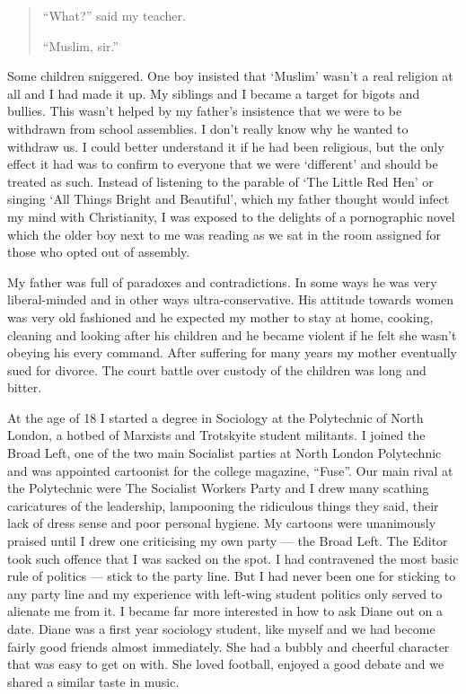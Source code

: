 \documentclass[12pt]{memoir}
\def\–{-\hskip0pt}
\begin{document}
\begin{quote}
“What?” said my teacher.

“Muslim, sir.”
\end{quote}

Some children sniggered.
One boy insisted that ‘Muslim’ wasn’t a real religion at all
and I had made it up.
My siblings and I became a target for bigots and bullies.
This wasn’t helped by my father’s insistence
that we were to be withdrawn from school assemblies.
I don’t really know why he wanted to withdraw us.
I could better understand it if he had been religious,
but the only effect it had was to confirm to everyone
that we were ‘different’ and should be treated as such.
Instead of listening to the parable of ‘The Little Red Hen’
or singing ‘All Things Bright and Beautiful’,
which my father thought would infect my mind with Christianity,
I was exposed to the delights of a pornographic novel
which the older boy next to me was reading
as we sat in the room assigned for those who opted out of assembly.

My father was full of paradoxes and contradictions.
In some ways he was very liberal-minded and in other ways ultra\–conservative.
His attitude towards women was very old fashioned
and he expected my mother to stay at home, cooking,
cleaning and looking after his children
and he became violent if he felt she wasn’t obeying his every command.
After suffering for many years my mother eventually sued for divorce.
The court battle over custody of the children was long and bitter.


At the age of 18 I started a degree in Sociology
at the Polytechnic of North London,
a hotbed of Marxists and Trotskyite student militants.
I joined the Broad Left, one of the two main Socialist parties
at North London Polytechnic and was appointed cartoonist
for the college magazine, “Fuse”.
Our main rival at the Polytechnic were The Socialist Workers Party
and I drew many scathing caricatures of the leadership,
lampooning the ridiculous things they said,
their lack of dress sense and poor personal hygiene.
My cartoons were unanimously praised until I drew one
criticising my own party — the Broad Left.
The Editor took such offence that I was sacked on the spot.
I had contravened the most basic rule of politics — stick to the party line.
But I had never been one for sticking to any party line
and my experience with left-wing student politics
only served to alienate me from it.
I became far more interested in how to ask Diane out on a date.
Diane was a first year sociology student,
like myself and we had become fairly good friends almost immediately.
She had a bubbly and cheerful character that was easy to get on with.
She loved football, enjoyed a good debate
and we shared a similar taste in music.
\end{document}
